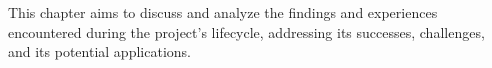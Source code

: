 
\label{SEC:DISCUSSION}

This chapter aims to discuss and analyze the findings and experiences encountered during the project's lifecycle,
addressing its successes, challenges,
and its potential applications.
